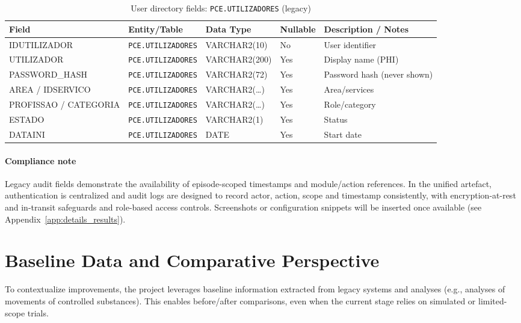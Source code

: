 \begin{table}[H]
    \centering
    \caption{User directory fields: \texttt{PCE.UTILIZADORES} (legacy)}
    \label{tab:users_directory_fields}
    {\setlength{\tabcolsep}{4pt}\small\renewcommand{\arraystretch}{1.2}
    \begin{tabularx}{\textwidth}{@{}>{\raggedright\arraybackslash}p{3.2cm} >{\raggedright\arraybackslash}p{3.0cm} >{\raggedright\arraybackslash}p{2.2cm} >{\centering\arraybackslash}p{1.7cm} >{\raggedright\arraybackslash}X@{}}
        \toprule
        \textbf{Field} & \textbf{Entity/Table} & \textbf{Data Type} & \textbf{Nullable} & \textbf{Description / Notes} \\
        \midrule
        IDUTILIZADOR & \texttt{PCE.UTILIZADORES} & VARCHAR2(10) & No & User identifier \\
        UTILIZADOR & \texttt{PCE.UTILIZADORES} & VARCHAR2(200) & Yes & Display name (PHI) \\
        PASSWORD\_HASH & \texttt{PCE.UTILIZADORES} & VARCHAR2(72) & Yes & Password hash (never shown) \\
        AREA / IDSERVICO & \texttt{PCE.UTILIZADORES} & VARCHAR2(\ldots) & Yes & Area/services \\
        PROFISSAO / CATEGORIA & \texttt{PCE.UTILIZADORES} & VARCHAR2(\ldots) & Yes & Role/category \\
        ESTADO & \texttt{PCE.UTILIZADORES} & VARCHAR2(1) & Yes & Status \\
        DATAINI & \texttt{PCE.UTILIZADORES} & DATE & Yes & Start date \\
        \bottomrule
    \end{tabularx}}
\end{table}

\paragraph{Compliance note}
Legacy audit fields demonstrate the availability of episode-scoped timestamps and module/action references. In the unified artefact, authentication is centralized and audit logs are designed to record actor, action, scope and timestamp consistently, with encryption-at-rest and in-transit safeguards and role-based access controls. Screenshots or configuration snippets will be inserted once available (see Appendix~\ref{app:details_results}).

\section{Baseline Data and Comparative Perspective}
To contextualize improvements, the project leverages baseline information extracted from legacy systems and analyses (e.g., analyses of movements of controlled substances). This enables before/after comparisons, even when the current stage relies on simulated or limited-scope trials.

